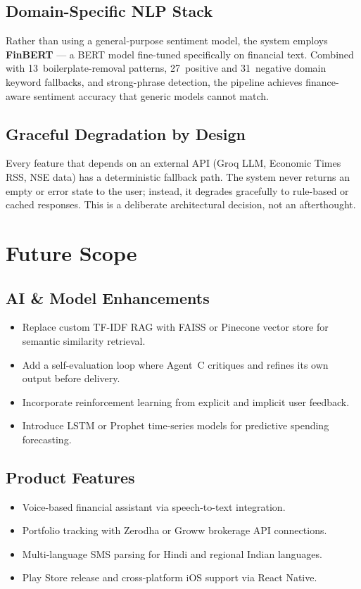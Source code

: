 \documentclass[12pt,a4paper]{article}
\begin{document}
\subsection{Domain-Specific NLP Stack}
Rather than using a general-purpose sentiment model, the system employs \textbf{FinBERT} --- a BERT model fine-tuned specifically on financial text. Combined with 13~boilerplate-removal patterns, 27~positive and 31~negative domain keyword fallbacks, and strong-phrase detection, the pipeline achieves finance-aware sentiment accuracy that generic models cannot match.

\subsection{Graceful Degradation by Design}
Every feature that depends on an external API (Groq LLM, Economic Times RSS, NSE data) has a deterministic fallback path. The system never returns an empty or error state to the user; instead, it degrades gracefully to rule-based or cached responses. This is a deliberate architectural decision, not an afterthought.

\newpage
\section{Future Scope}

\subsection{AI \& Model Enhancements}
\begin{itemize}[leftmargin=1.5em]
  \item Replace custom TF-IDF RAG with FAISS or Pinecone vector store for semantic similarity retrieval.
  \item Add a self-evaluation loop where Agent~C critiques and refines its own output before delivery.
  \item Incorporate reinforcement learning from explicit and implicit user feedback.
  \item Introduce LSTM or Prophet time-series models for predictive spending forecasting.
\end{itemize}

\subsection{Product Features}
\begin{itemize}[leftmargin=1.5em]
  \item Voice-based financial assistant via speech-to-text integration.
  \item Portfolio tracking with Zerodha or Groww brokerage API connections.
  \item Multi-language SMS parsing for Hindi and regional Indian languages.
  \item Play Store release and cross-platform iOS support via React Native.
\end{itemize}
\end{document}
